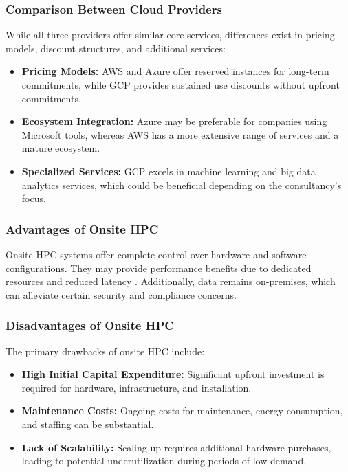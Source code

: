 \documentclass{article}
\begin{document}
\subsubsection{Comparison Between Cloud Providers}
While all three providers offer similar core services, differences exist in pricing models, discount structures, and additional services:
\begin{itemize}
    \item \textbf{Pricing Models:} AWS and Azure offer reserved instances for long-term commitments, while GCP provides sustained use discounts without upfront commitments.
    \item \textbf{Ecosystem Integration:} Azure may be preferable for companies using Microsoft tools, whereas AWS has a more extensive range of services and a mature ecosystem.
    \item \textbf{Specialized Services:} GCP excels in machine learning and big data analytics services, which could be beneficial depending on the consultancy's focus.
\end{itemize}

\subsubsection{Advantages of Onsite HPC}
Onsite HPC systems offer complete control over hardware and software configurations. They may provide performance benefits due to dedicated resources and reduced latency \parencite{stergiou2018iot}. Additionally, data remains on-premises, which can alleviate certain security and compliance concerns.

\subsubsection{Disadvantages of Onsite HPC}

The primary drawbacks of onsite HPC include:

\begin{itemize}
    \item \textbf{High Initial Capital Expenditure:} Significant upfront investment is required for hardware, infrastructure, and installation.
    \item \textbf{Maintenance Costs:} Ongoing costs for maintenance, energy consumption, and staffing can be substantial.
    \item \textbf{Lack of Scalability:} Scaling up requires additional hardware purchases, leading to potential underutilization during periods of low demand.
\end{itemize}
\end{document}

